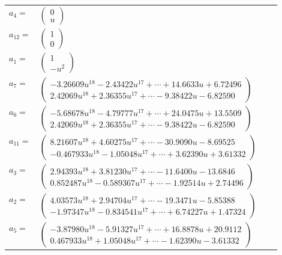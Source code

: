 \documentclass[1p]{elsarticle_modified}
\theoremstyle{definition}
\begin{document}
\begin{tabular}{m{7pt} m{180pt} m{7pt} m{180pt} }
\flushright $a_{4}=$&$\begin{pmatrix}0\\u\end{pmatrix}$ \\
\flushright $a_{12}=$&$\begin{pmatrix}1\\0\end{pmatrix}$ \\
\flushright $a_{1}=$&$\begin{pmatrix}1\\- u^2\end{pmatrix}$ \\
\flushright $a_{7}=$&$\begin{pmatrix}-3.26609 u^{18}-2.43422 u^{17}+\cdots+14.6633 u+6.72496\\2.42069 u^{18}+2.36355 u^{17}+\cdots-9.38422 u-6.82590\end{pmatrix}$ \\
\flushright $a_{6}=$&$\begin{pmatrix}-5.68678 u^{18}-4.79777 u^{17}+\cdots+24.0475 u+13.5509\\2.42069 u^{18}+2.36355 u^{17}+\cdots-9.38422 u-6.82590\end{pmatrix}$ \\
\flushright $a_{11}=$&$\begin{pmatrix}8.21607 u^{18}+4.60275 u^{17}+\cdots-30.9090 u-8.69525\\-0.467933 u^{18}-1.05048 u^{17}+\cdots+3.62390 u+3.61332\end{pmatrix}$ \\
\flushright $a_{3}=$&$\begin{pmatrix}2.94393 u^{18}+3.81230 u^{17}+\cdots-11.6400 u-13.6846\\0.852487 u^{18}-0.589367 u^{17}+\cdots-1.92514 u+2.74496\end{pmatrix}$ \\
\flushright $a_{2}=$&$\begin{pmatrix}4.03573 u^{18}+2.94704 u^{17}+\cdots-19.3471 u-5.85388\\-1.97347 u^{18}-0.834541 u^{17}+\cdots+6.74227 u+1.47324\end{pmatrix}$ \\
\flushright $a_{5}=$&$\begin{pmatrix}-3.87980 u^{18}-5.91327 u^{17}+\cdots+16.8878 u+20.9112\\0.467933 u^{18}+1.05048 u^{17}+\cdots-1.62390 u-3.61332\end{pmatrix}$ \\

\end{tabular}
\end{document}
